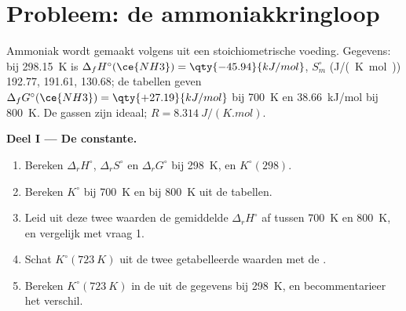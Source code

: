 \section{Probleem: de ammoniakkringloop}

\begin{problem}
\label{pb:b2:equilibrium-shifts:1}
Ammoniak wordt gemaakt volgens  uit een stoichiometrische voeding.
Gegevens: bij \qty{298.15}{K} is $\Delta_f H^\circ(\ce{NH3}) = \qty{-45.94}{kJ/mol}$,
$S^\circ_m$ (\unit{J/(K.mol)})  192.77,  191.61,  130.68;
de tabellen geven $\Delta_f G^\circ(\ce{NH3}) = \qty{+27.19}{kJ/mol}$ bij
\qty{700}{K} en \qty{+38.66}{kJ/mol} bij \qty{800}{K}. De gassen zijn ideaal;
$R = \qty{8.314}{J/(K.mol)}$.

\medskip
\noindent\textbf{Deel I --- De constante.}
\begin{enumerate}
  \item Bereken $\Delta_r H^\circ$, $\Delta_r S^\circ$ en $\Delta_r G^\circ$ bij
        \qty{298}{K}, en $K^\circ(298)$.
  \item Bereken $K^\circ$ bij \qty{700}{K} en bij \qty{800}{K} uit de tabellen.
  \item Leid uit deze twee waarden de gemiddelde $\Delta_r H^\circ$ af tussen
        \qty{700}{K} en \qty{800}{K}, en vergelijk met vraag 1.
  \item Schat $K^\circ(\qty{723}{K})$ uit de twee getabelleerde waarden met
        de .
  \item Bereken $K^\circ(\qty{723}{K})$ in de  uit
        de gegevens bij \qty{298}{K}, en becommentarieer het verschil.
\end{enumerate}


\end{problem}
